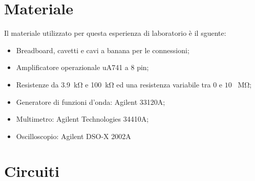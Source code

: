 \section*{Materiale}

Il materiale utilizzato per questa esperienza di laboratorio è il sguente:

\begin{itemize}
    \item{Breadboard, cavetti e cavi a banana per le connessioni;}
    \item{Amplificatore operazionale uA741 a 8 pin;}
    \item{Resistenze da \SI{3.9}{\kilo\ohm} e \SI{100}{\kilo\ohm} ed una resistenza variabile tra $0$ e $10$ \SI{}{\mega\ohm};}
    \item{Generatore di funzioni d'onda: Agilent 33120A;}
    \item{Multimetro: Agilent Technologies 34410A;}
    \item{Oscilloscopio: Agilent DSO-X 2002A}
\end{itemize}

\section*{Circuiti}